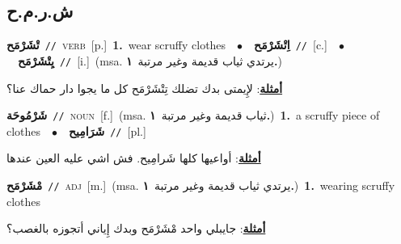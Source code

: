 \documentclass[10pt,a4paper,twoside]{article} %
\begin{document}
\begin{multicols}{2}
\vspace{-3mm}
\subsection*{\color{blue}\foreignlanguage{arabic}{ش.ر.م.ح}\color{blue}{}} 

{\setlength\topsep{0pt}\textbf{\foreignlanguage{arabic}{تْشَرْمَح}}\ {\color{gray}\texttt{//}\color{black}}\ \textsc{verb}\ [p.]\ \textbf{1.}~wear scruffy clothes\ \ $\bullet$\ \ \setlength\topsep{0pt}\textbf{\foreignlanguage{arabic}{اِتْشَرْمَح}}\ {\color{gray}\texttt{//}\color{black}}\ [c.]\ \ $\bullet$\ \ \setlength\topsep{0pt}\textbf{\foreignlanguage{arabic}{يِتْشَرْمَح}}\ {\color{gray}\texttt{//}\color{black}}\ [i.]\ \color{gray}(msa. \foreignlanguage{arabic}{يرتدي ثياب قديمة وغير مرتبة}~\foreignlanguage{arabic}{\textbf{١.}})\color{black}\  \begin{flushright}\color{gray}\foreignlanguage{arabic}{\textbf{\underline{\foreignlanguage{arabic}{أمثلة}}}: لإِيمتى بدك تضلك تِتْشَرْمَح كل ما يجوا دار حماك عنا؟}\end{flushright}\color{black}} \vspace{2mm}

{\setlength\topsep{0pt}\textbf{\foreignlanguage{arabic}{شَرْمُوحَة}}\ {\color{gray}\texttt{//}\color{black}}\ \textsc{noun}\ [f.]\ \color{gray}(msa. \foreignlanguage{arabic}{ثياب قديمة وغير مرتبة}~\foreignlanguage{arabic}{\textbf{١.}})\color{black}\ \textbf{1.}~a scruffy piece of clothes\ \ $\bullet$\ \ \setlength\topsep{0pt}\textbf{\foreignlanguage{arabic}{شَرَامِيح}}\ {\color{gray}\texttt{//}\color{black}}\ [pl.]\  \begin{flushright}\color{gray}\foreignlanguage{arabic}{\textbf{\underline{\foreignlanguage{arabic}{أمثلة}}}: أواعيها كلها شَرامِيح. فش اشي عليه العين عندها}\end{flushright}\color{black}} \vspace{2mm}

{\setlength\topsep{0pt}\textbf{\foreignlanguage{arabic}{مْشَرْمَح}}\ {\color{gray}\texttt{//}\color{black}}\ \textsc{adj}\ [m.]\ \color{gray}(msa. \foreignlanguage{arabic}{يرتدي ثياب قديمة وغير مرتبة}~\foreignlanguage{arabic}{\textbf{١.}})\color{black}\ \textbf{1.}~wearing scruffy clothes\  \begin{flushright}\color{gray}\foreignlanguage{arabic}{\textbf{\underline{\foreignlanguage{arabic}{أمثلة}}}: جايبلي واحد مْشَرْمَح وبدك إِياني أتجوزه بالغصب؟}\end{flushright}\color{black}} \vspace{2mm}


\end{multicols}
\end{document}
